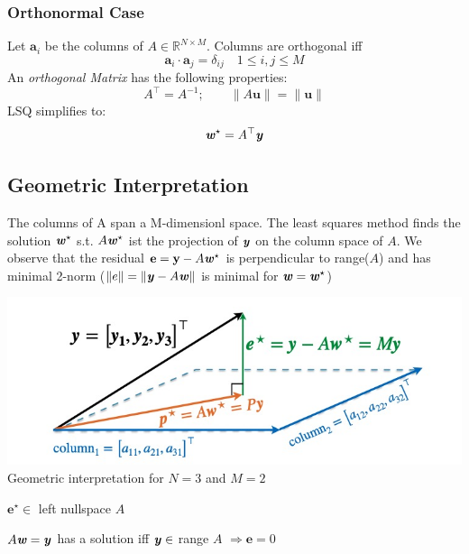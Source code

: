     \subsubsection{Orthonormal Case}
        Let $\mathbf{a}_i$ be the columns of $A \in\mathbb{R}^{N\times M}$. Columns are orthogonal iff \begin{equation*}
            \mathbf{a}_i \cdot \mathbf{a}_j = \delta_{ij} \quad 1 \leq i,j \leq M
        \end{equation*}
        An \textit{orthogonal Matrix} has the following properties:
        \begin{equation*}
            A^\top = A^{-1}; \qquad \|A\mathbf{u}\| = \|\mathbf{u}\|
        \end{equation*}
        LSQ simplifies to:
        \begin{equation*}
            \textbf{\textit{w}}^\star = A^\top\textbf{\textit{y}}
        \end{equation*}
        
    \subsection{Geometric Interpretation}
        The columns of A span a M-dimensionl space. The least squares method finds the solution $\textbf{\textit{w}}^\star$ s.t. $A\textbf{\textit{w}}^\star$ ist the projection of $\textbf{\textit{y}}$ on the column space of $A$.
        We observe that the residual $\mathbf{e} = \mathbf{y}-A\textbf{\textit{w}}^\star$ is perpendicular to  range($A$) and has minimal 2-norm ($\|e\|=\|\textbf{\textit{y}}-A\textbf{\textit{w}}\|$ is minimal for $\textbf{\textit{w}} = \textbf{\textit{w}}^\star$)
        \begin{center}
            \includegraphics[width = 0.7\linewidth]{images/01/geometric_interpretation.jpg}\\
            Geometric interpretation for $N=3$ and $M = 2$
        \end{center}
        
        $\mathbf{e}^\star\in$ left nullspace $A$
        
        $A\textbf{\textit{w}} = \textbf{\textit{y}}$ has a solution iff $\textbf{\textit{y}}\in$ range $A$ $\Rightarrow \mathbf{e} = 0$

